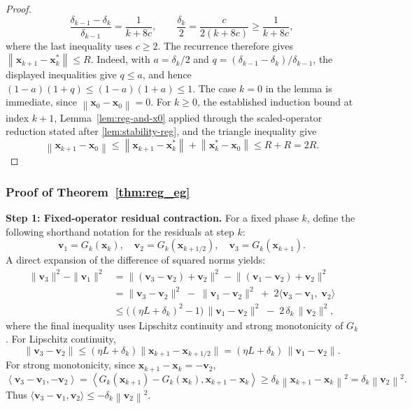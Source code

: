 \documentclass[letterpaper,11pt]{article}
\newcommand{\norm}[1]{\left\| #1 \right\|}
\newcommand{\angles}[1]{\left\langle #1 \right \rangle}
\newcommand{\vect}[1]{\mathbf{#1}}
\begin{document}
\begin{proof}
\[
\frac{\delta_{k-1}-\delta_k}{\delta_{k-1}}=\frac{1}{k+8c},
\qquad
\frac{\delta_k}{2}=\frac{c}{2(k+8c)}\ge\frac{1}{k+8c},
\]
where the last inequality uses \(c\ge2\). The recurrence therefore gives \(\norm{\vect{x}_{k+1} - \vect{x}_k^*} \le R\).
Indeed, with \(a=\delta_k/2\) and \(q=(\delta_{k-1}-\delta_k)/\delta_{k-1}\), the displayed inequalities give \(q\le a\), and hence \((1-a)(1+q)\le(1-a)(1+a)\le1\).
The case \(k=0\) in the lemma is immediate, since \(\norm{\vect{x}_0-\vect{x}_0}=0\). For \(k\ge0\), the established induction bound at index \(k+1\), Lemma~\ref{lem:reg-and-x0} applied through the scaled-operator reduction stated after \cref{lem:stability-reg}, and the triangle inequality give
\[
    \norm{\vect{x}_{k+1} - \vect{x}_0} \le \norm{\vect{x}_{k+1} - \vect{x}_k^*} + \norm{\vect{x}_k^* - \vect{x}_0} \le R + R = 2R.
\]
\end{proof}

\subsubsection{Proof of Theorem~\ref{thm:reg_eg}}
\noindent\textbf{Step 1: Fixed-operator residual contraction.}
For a fixed phase \(k\), define the following shorthand notation for the residuals at step $k$:
\[
  \vect{v}_1 = G_{k}(\vect{x}_k),\quad
  \vect{v}_2 = G_{k}(\vect{x}_{k+1/2}),\quad
  \vect{v}_3 = G_{k}(\vect{x}_{k+1}).
\]
A direct expansion of the difference of squared norms yields:
\begin{align*}
  \|\vect{v}_3\|^2 - \|\vect{v}_1\|^2
  &= \bigl\|(\vect{v}_3 - \vect{v}_2) + \vect{v}_2\bigr\|^2
   - \bigl\|(\vect{v}_1 - \vect{v}_2) + \vect{v}_2\bigr\|^2 \\[-0.3em]
  &= \|\vect{v}_3 - \vect{v}_2\|^2 \;-\;\|\vect{v}_1 - \vect{v}_2\|^2
   \;+\;2\bigl\langle \vect{v}_3 - \vect{v}_1,\;\vect{v}_2\bigr\rangle \\[-0.3em]
  &\le \bigl((\eta L + \delta_{k})^2 - 1\bigr)\,\|\vect{v}_1 - \vect{v}_2\|^2
   \;-\;2\,\delta_{k}\,\|\vect{v}_2\|^2,
\end{align*}
where the final inequality uses Lipschitz continuity and strong monotonicity of
$G_k$. For Lipschitz continuity,
\[
\|\vect{v}_3 - \vect{v}_2\|\le(\eta L + \delta_{k})\|\vect{x}_{k+1}-\vect{x}_{k+1/2}\|
=(\eta L + \delta_{k})\,\|\vect{v}_1 - \vect{v}_2\|.
\]
For strong monotonicity, since \(\vect{x}_{k+1}-\vect{x}_k=-\vect{v}_2\),
\[
\angles{\vect{v}_3-\vect{v}_1,-\vect{v}_2}
=
\angles{G_k(\vect{x}_{k+1})-G_k(\vect{x}_k),\vect{x}_{k+1}-\vect{x}_k}
\ge
\delta_k\norm{\vect{x}_{k+1}-\vect{x}_k}^2
=
\delta_k\norm{\vect{v}_2}^2.
\]
Thus \(\langle \vect{v}_3-\vect{v}_1,\vect{v}_2\rangle\le -\delta_k\norm{\vect{v}_2}^2\).
\end{document}
